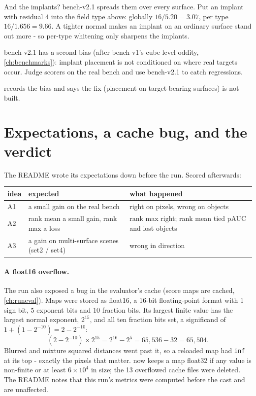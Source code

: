 And the implants? bench-v2.1 spreads them over every surface. Put an implant with residual 4 into the field type above:
globally $16 / 5.20 = 3.07$, per type $16 / 1.656 = 9.66$. A tighter normal makes an implant on an ordinary surface stand out
more - so per-type whitening only sharpens the implants.

\begin{keypoint}
bench-v2.1 has a second bias (after bench-v1's cube-level oddity, \cref{ch:benchmarks}): implant placement is not
conditioned on where real targets occur. Judge scorers on the real bench and use bench-v2.1 to catch regressions.
\end{keypoint}

 records the bias and says the fix (placement on target-bearing surfaces) is not built.

\section{Expectations, a cache bug, and the verdict}\label{sec:scoringgains:verdict}

The README wrote its expectations down before the run. Scored afterwards:
\begin{center}
\small
\begin{tabular}{lp{5.2cm}p{5.6cm}}
\toprule
idea & expected & what happened \\
\midrule
A1 & a small gain on the real bench & right on pixels, wrong on objects \\
A2 & rank mean a small gain, rank max a loss & rank max right; rank mean tied pAUC and lost objects \\
A3 & a gain on multi-surface scenes (set2 / set4) & wrong in direction \\
\bottomrule
\end{tabular}
\end{center}

\paragraph{A float16 overflow.} 
The run also exposed a bug in the evaluator's cache (score maps are cached, \cref{ch:runeval}). Maps were stored as
float16, a 16-bit floating-point format with 1 sign bit, 5 exponent bits and 10 fraction bits. Its largest finite value
has the largest normal exponent, $2^{15}$, and all ten fraction bits set, a significand of $1 + (1 - 2^{-10}) = 2 -
2^{-10}$:
\[
(2 - 2^{-10}) \times 2^{15} = 2^{16} - 2^{5} = 65{,}536 - 32 = 65{,}504 .
\]
Blurred and mixture squared distances went past it, so a reloaded map had \texttt{inf} at its top - exactly the pixels that
matter.  now keeps a map float32 if any value is non-finite or at least $6 \times 10^4$ in size; the 13
overflowed cache files were deleted. The README notes that this run's metrics were computed before the cast and are
unaffected.

